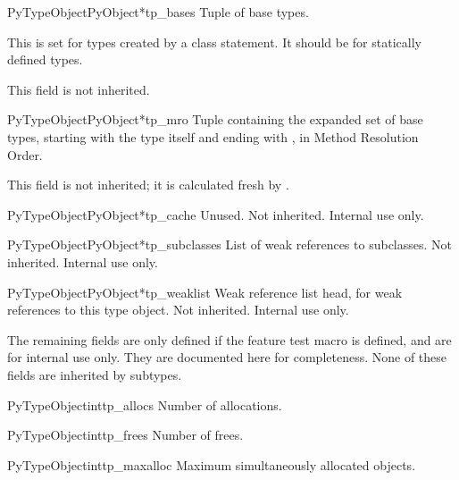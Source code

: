 \begin{cmemberdesc}{PyTypeObject}{PyObject*}{tp_bases}
  Tuple of base types.

  This is set for types created by a class statement.  It should be
  \NULL{} for statically defined types.

  This field is not inherited.
\end{cmemberdesc}

\begin{cmemberdesc}{PyTypeObject}{PyObject*}{tp_mro}
  Tuple containing the expanded set of base types, starting with the
  type itself and ending with , in Method Resolution
  Order.

  This field is not inherited; it is calculated fresh by
  .
\end{cmemberdesc}

\begin{cmemberdesc}{PyTypeObject}{PyObject*}{tp_cache}
  Unused.  Not inherited.  Internal use only.
\end{cmemberdesc}

\begin{cmemberdesc}{PyTypeObject}{PyObject*}{tp_subclasses}
  List of weak references to subclasses.  Not inherited.  Internal
  use only.
\end{cmemberdesc}

\begin{cmemberdesc}{PyTypeObject}{PyObject*}{tp_weaklist}
  Weak reference list head, for weak references to this type
  object.  Not inherited.  Internal use only.
\end{cmemberdesc}

The remaining fields are only defined if the feature test macro
 is defined, and are for internal use only.
They are documented here for completeness.  None of these fields are
inherited by subtypes.

\begin{cmemberdesc}{PyTypeObject}{int}{tp_allocs}
  Number of allocations.
\end{cmemberdesc}

\begin{cmemberdesc}{PyTypeObject}{int}{tp_frees}
  Number of frees.
\end{cmemberdesc}

\begin{cmemberdesc}{PyTypeObject}{int}{tp_maxalloc}
  Maximum simultaneously allocated objects.
\end{cmemberdesc}

